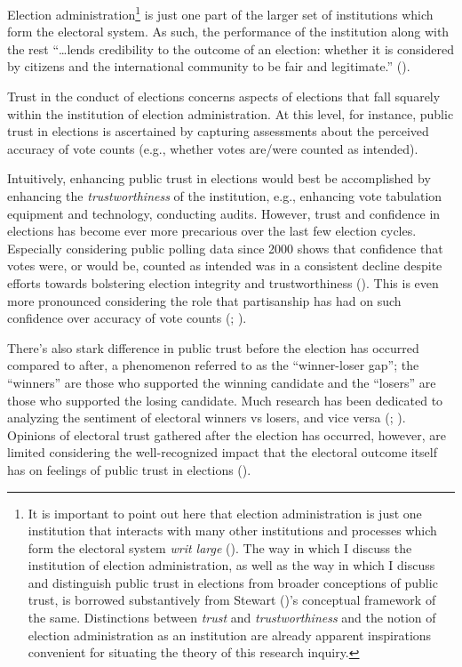 \documentclass[
  12pt,
  letterpaper,
]{article}
\begin{document}
Election administration\footnote{It is important to point out here that
  election administration is just one institution that interacts with
  many other institutions and processes which form the electoral system
  \emph{writ large} (). The way
  in which I discuss the institution of election administration, as well
  as the way in which I discuss and distinguish public trust in
  elections from broader conceptions of public trust, is borrowed
  substantively from Stewart ()'s
  conceptual framework of the same. Distinctions between \emph{trust}
  and \emph{trustworthiness} and the notion of election administration
  as an institution are already apparent inspirations convenient for
  situating the theory of this research inquiry.} is just one part of
the larger set of institutions which form the electoral system. As such,
the performance of the institution along with the rest ``\ldots lends
credibility to the outcome of an election: whether it is considered by
citizens and the international community to be fair and legitimate.''
().

Trust in the conduct of elections concerns aspects of elections that
fall squarely within the institution of election administration. At this
level, for instance, public trust in elections is ascertained by
capturing assessments about the perceived accuracy of vote counts (e.g.,
whether votes are/were counted as intended).

Intuitively, enhancing public trust in elections would best be
accomplished by enhancing the \emph{trustworthiness} of the institution,
e.g., enhancing vote tabulation equipment and technology, conducting
audits. However, trust and confidence in elections has become ever more
precarious over the last few election cycles. Especially considering
public polling data since 2000 shows that confidence that votes were, or
would be, counted as intended was in a consistent decline despite
efforts towards bolstering election integrity and trustworthiness
(). This is even more
pronounced considering the role that partisanship has had on such
confidence over accuracy of vote counts
(;
).

There's also stark difference in public trust before the election has
occurred compared to after, a phenomenon referred to as the
``winner-loser gap''; the ``winners'' are those who supported the
winning candidate and the ``losers'' are those who supported the losing
candidate. Much research has been dedicated to analyzing the sentiment
of electoral winners vs losers, and vice versa
(;
). Opinions of electoral
trust gathered after the election has occurred, however, are limited
considering the well-recognized impact that the electoral outcome itself
has on feelings of public trust in elections
().
\end{document}
